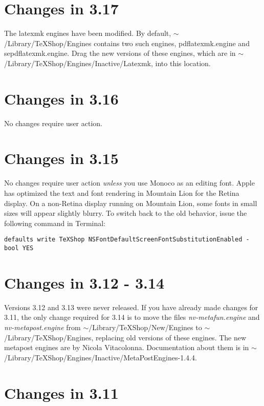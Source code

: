 \documentclass[11pt, oneside]{amsart}
\begin{document}
\section{Changes in 3.17}

The latexmk engines have been modified. By default, $\sim$/Library/TeXShop/Engines contains two such engines, pdflatexmk.engine and sepdflatexmk.engine. Drag the new versions of these engines,
which are in $\sim$/Library/TeXShop/Engines/Inactive/Latexmk, into this location.


\section{Changes in 3.16}

No changes require user action.

\section{Changes in 3.15}

No changes require user action {\em unless} you use Monoco as an editing font. Apple has optimized the
text and font rendering in Mountain Lion for the Retina display. On a non-Retina display running on Mountain Lion, some fonts in small sizes will appear slightly blurry. To switch back to the old behavior, issue the following
command in Terminal:
\begin{verbatim}
defaults write TeXShop NSFontDefaultScreenFontSubstitutionEnabled -bool YES
\end{verbatim}

\section{Changes in 3.12 - 3.14}

Versions 3.12 and 3.13 were never released. If you have already made changes for 3.11,
the only change required for 3.14 is to move the files {\em nv-metafun.engine} and {\em nv-metapost.engine} from $\sim$/Library/TeXShop/New/Engines to
$\sim$/Library/TeXShop/Engines, replacing old versions of these engines. The new metapost engines are by Nicola Vitacolonna. Documentation
about them is in $\sim$/Library/TeXShop/Engines/Inactive/MetaPostEngines-1.4.4.

\section{Changes in 3.11}
\end{document}
